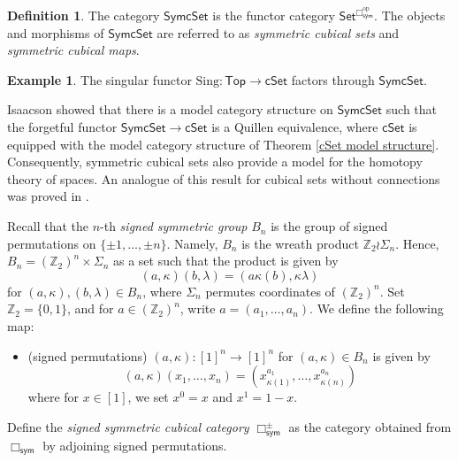 \documentclass[oneside, 12pt]{amsart}
\numberwithin{equation}{section}
\theoremstyle{plain}
\theoremstyle{definition}
\newtheorem{definition}[theorem]{Definition}
\newtheorem{example}[theorem]{Example}
\theoremstyle{remark}
\newcommand{\Z}{\mathbb{Z}}
\newcommand{\cSet}{\mathsf{cSet}}
\newcommand{\SymcSet}{\mathsf{SymcSet}}
\begin{document}
	
	
	\begin{definition}
		The category $\SymcSet$ is the functor category $\mathsf{Set}^{\Box_\mathsf{sym}^\mathrm{op}}$. The objects and morphisms of $\SymcSet$ are referred to as \emph{symmetric cubical sets} and \emph{symmetric cubical maps}.
	\end{definition}
	
	
	
	\begin{example}
		The singular functor $\mathrm{Sing}\colon\mathsf{Top}\to\cSet$ factors through $\SymcSet$.
	\end{example}
	
	
	Isaacson \cite{I} showed that there is a model category structure on $\SymcSet$ such that the forgetful functor $\SymcSet\to\cSet$ is a Quillen equivalence, where $\cSet$ is equipped with the model category structure of Theorem \ref{cSet model structure}. Consequently, symmetric cubical sets also provide a model for the homotopy theory of spaces. An analogue of this result for cubical sets without connections was proved in \cite[Theorem 5.9]{Ar}.
	
	
	
	Recall that the $n$-th \emph{signed symmetric group} $B_n$ is the group of signed permutations on $\{\pm 1,\ldots,\pm n\}$. Namely, $B_n$ is the wreath product $\Z_2\wr\Sigma_n$. Hence, $B_n=(\Z_2)^n\times\Sigma_n$ as a set such that the product is given by
	\[
	(a,\kappa)(b,\lambda)=(a\kappa(b),\kappa\lambda)
	\]
	for $(a,\kappa),(b,\lambda)\in B_n$, where $\Sigma_n$ permutes coordinates of $(\Z_2)^n$. Set $\Z_2=\{0,1\}$, and for $a\in(\Z_2)^n$, write $a=(a_1,\ldots,a_n)$. We define the following map:
	\begin{itemize}
		\item (signed permutations) $(a,\kappa)\colon[1]^n\to[1]^n$ for $(a,\kappa)\in B_n$ is given by
		\[
		(a,\kappa)(x_1,\ldots,x_n)=(x_{\kappa(1)}^{a_1},\ldots,x_{\kappa(n)}^{a_n})
		\]
		where for $x\in[1]$, we set $x^0=x$ and $x^1=1-x$.
	\end{itemize}
	Define the \emph{signed symmetric cubical category} $\Box_\mathsf{sym}^\pm$ as the category obtained from $\Box_\mathsf{sym}$ by adjoining signed permutations.
	
	
	
\end{document}
